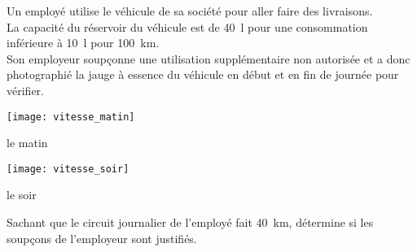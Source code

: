 \begin{exercice}[L'enquête]
Un employé utilise le véhicule de sa société pour aller faire des livraisons. \\[0.5em]
La capacité du réservoir du véhicule est de 40 l pour une consommation inférieure à 10 l pour 100 km. \\[0.5em]
Son employeur soupçonne une utilisation supplémentaire non autorisée et a donc photographié la jauge à essence du véhicule en début et en fin de journée pour vérifier.

\begin{minipage}[c]{0.48\linewidth}
 \texttt{[image: vitesse\_matin]}
 \begin{center} le matin \end{center}
 \end{minipage} \hfill%
 \begin{minipage}[c]{0.48\linewidth}
 \texttt{[image: vitesse\_soir]}
 \begin{center} le soir \end{center}
  \end{minipage}
Sachant que le circuit journalier de l'employé fait 40 km, détermine si les soupçons de l'employeur sont justifiés.
\end{exercice}


